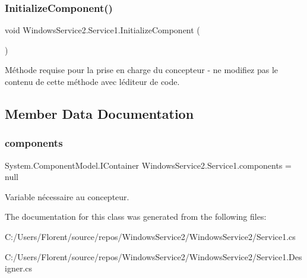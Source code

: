 \subsubsection{\texorpdfstring{Initialize\+Component()}{InitializeComponent()}}
{\footnotesize\ttfamily void Windows\+Service2.\+Service1.\+Initialize\+Component (\begin{DoxyParamCaption}{ }\end{DoxyParamCaption})\hspace{0.3cm}{\ttfamily [private]}}



Méthode requise pour la prise en charge du concepteur -\/ ne modifiez pas le contenu de cette méthode avec l\textquotesingle{}éditeur de code. 



\subsection{Member Data Documentation}
\mbox{\label{class_windows_service2_1_1_service1_ab01ecad17e7152bd796777c9100d2e3a}} 
\subsubsection{\texorpdfstring{components}{components}}
{\footnotesize\ttfamily System.\+Component\+Model.\+I\+Container Windows\+Service2.\+Service1.\+components = null\hspace{0.3cm}{\ttfamily [private]}}



Variable nécessaire au concepteur. 



The documentation for this class was generated from the following files\+:\begin{DoxyCompactItemize}
\item 
C\+:/\+Users/\+Florent/source/repos/\+Windows\+Service2/\+Windows\+Service2/Service1.\+cs\item 
C\+:/\+Users/\+Florent/source/repos/\+Windows\+Service2/\+Windows\+Service2/Service1.\+Designer.\+cs\end{DoxyCompactItemize}

